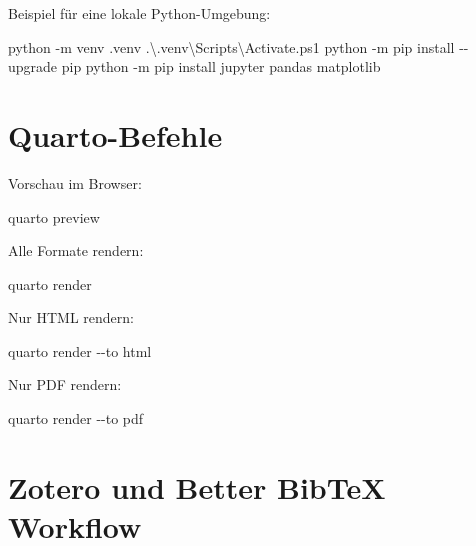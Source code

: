\documentclass[
  ngerman,
  a4paper,
  DIV=11,
  oneside]{scrreprt}
\newenvironment{Shaded}{\begin{snugshade}}{\end{snugshade}}
\newcommand{\FunctionTok}[1]{\textcolor[rgb]{0.28,0.35,0.67}{#1}}
\newcommand{\NormalTok}[1]{\textcolor[rgb]{0.00,0.23,0.31}{#1}}
\newcommand{\OperatorTok}[1]{\textcolor[rgb]{0.37,0.37,0.37}{#1}}
\begin{document}
Beispiel für eine lokale Python-Umgebung:

\begin{Shaded}
\begin{Highlighting}[]
\NormalTok{python }\OperatorTok{{-}}\NormalTok{m venv }\OperatorTok{.}\FunctionTok{venv}
\OperatorTok{.}\NormalTok{\textbackslash{}}\OperatorTok{.}\FunctionTok{venv}\NormalTok{\textbackslash{}Scripts\textbackslash{}Activate}\OperatorTok{.}\FunctionTok{ps1}
\NormalTok{python }\OperatorTok{{-}}\NormalTok{m pip install }\OperatorTok{{-}{-}}\NormalTok{upgrade pip}
\NormalTok{python }\OperatorTok{{-}}\NormalTok{m pip install jupyter pandas matplotlib}
\end{Highlighting}
\end{Shaded}

\section{Quarto-Befehle}\label{quarto-befehle}

Vorschau im Browser:

\begin{Shaded}
\begin{Highlighting}[]
\NormalTok{quarto preview}
\end{Highlighting}
\end{Shaded}

Alle Formate rendern:

\begin{Shaded}
\begin{Highlighting}[]
\NormalTok{quarto render}
\end{Highlighting}
\end{Shaded}

Nur HTML rendern:

\begin{Shaded}
\begin{Highlighting}[]
\NormalTok{quarto render }\OperatorTok{{-}{-}}\NormalTok{to html}
\end{Highlighting}
\end{Shaded}

Nur PDF rendern:

\begin{Shaded}
\begin{Highlighting}[]
\NormalTok{quarto render }\OperatorTok{{-}{-}}\NormalTok{to pdf}
\end{Highlighting}
\end{Shaded}

\section{Zotero und Better BibTeX
Workflow}\label{zotero-und-better-bibtex-workflow}
\end{document}
